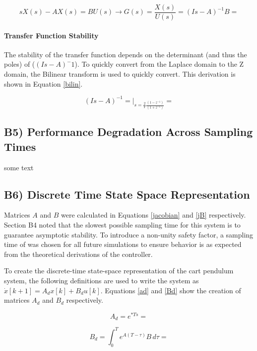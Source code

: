 \documentclass{article}
\begin{document}
\begin{equation}\label{acctf}
    sX(s)-AX(s)=BU(s)\rightarrow G(s)=\frac{X(s)}{U(s)}=(Is-A)^{-1}B= 
\end{equation}

\paragraph{Transfer Function Stability}
The stability of the transfer function depends on the determinant (and thus the poles) of ($(Is-A)^-1$). To quickly convert from the Laplace domain to the Z domain, the Bilinear transform is used to quickly convert. This derivation is shown in Equation \ref{bilin}.

\begin{equation}\label{bilin}
(Is-A)^{-1}=\left.  \right|_{s=\frac{2}{T} \frac{(1 - z^{-1})}{(1+z^{-1})}}=
\end{equation}


\subsection*{B5) Performance Degradation Across Sampling Times}

some text

\subsection*{B6) Discrete Time State Space Representation}
Matrices $A$ and $B$ were calculated in Equations \ref{jacobian} and \ref{jB} respectively. Section B4 noted that the slowest possible sampling time for this system is to guarantee asymptotic stability. To introduce a non-unity safety factor, a sampling time of  was chosen for all future simulations to ensure behavior is as expected from the theoretical derivations of the controller.

To create the discrete-time state-space representation of the cart pendulum system, the following definitions are used to write the system as $\dot x[k+1]=A_dx[k]+B_du[k]$. Equations \ref{ad} and \ref{Bd} show the creation of matrices $A_d$ and $B_d$ respectively.

\begin{equation}\label{ad}
    A_d=e^{*Ts}=
\end{equation}


\begin{equation}\label{Bd}
    B_d=\int_{0}^{T} e^{A(T - \tau)} B \, d\tau=
\end{equation}
\end{document}
